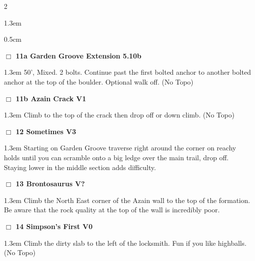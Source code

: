 \begin{multicols}{2}
\begin{adjustwidth}{1.3em}{}
\end{adjustwidth}
\begin{adjustwidth}{0.5cm}{}				
\needspace{4em}
\needspace{2em}
\label{vr:Garden Groove Extension}
\colorbox{RoyalBlue!20}{
\parbox{0.95\linewidth}{
\hspace{-1ex}\textbf{$\Box$
11a Garden Groove Extension 5.10b  
}}}
\begin{adjustwidth}{1.3em}{}			
50', Mixed. 2 bolts. Continue past the first bolted anchor to another bolted anchor at the top of the boulder. Optional walk off.
  (No Topo)
\end{adjustwidth}
\needspace{2em}
\label{vr:Azain Crack}
\colorbox{green!20}{
\parbox{0.95\linewidth}{
\hspace{-1ex}\textbf{$\Box$
11b Azain Crack V1  
}}}
\begin{adjustwidth}{1.3em}{}			
Climb to the top of the crack then drop off or down climb.
  (No Topo)
\end{adjustwidth}
\end{adjustwidth}
\needspace{2em}
\label{rt:Sometimes}
\colorbox{green!20}{
\parbox{0.95\linewidth}{
\hspace{-1ex}\textbf{$\Box$
12 Sometimes V3  
}}}
\begin{adjustwidth}{1.3em}{}			
Starting on Garden Groove traverse right around the corner on reachy holds until you can scramble onto a big ledge over the main trail, drop off. Staying lower in the middle section adds difficulty.
\end{adjustwidth}
\needspace{2em}
\label{rt:Brontosaurus}
\colorbox{black!20}{
\parbox{0.95\linewidth}{
\hspace{-1ex}\textbf{$\Box$
13 Brontosaurus V?  \warn\warn\warn
}}}
\begin{adjustwidth}{1.3em}{}			
Climb the North East corner of the Azain wall to the top of the formation. Be aware that the rock quality at the top of the wall is incredibly poor.
\end{adjustwidth}
\needspace{2em}
\label{rt:Simpson's First}
\colorbox{green!20}{
\parbox{0.95\linewidth}{
\hspace{-1ex}\textbf{$\Box$
14 Simpson's First V0  
}}}
\begin{adjustwidth}{1.3em}{}			
Climb the dirty slab to the left of the locksmith. Fun if you like highballs.
  (No Topo)
\end{adjustwidth}
	\end{multicols}
